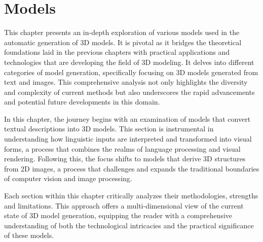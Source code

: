 \chapter{Models}\label{ch:models}

This chapter presents an in-depth exploration of various models used in the automatic generation of 3D models. It is pivotal as it bridges the theoretical foundations laid in the previous chapters with practical applications and technologies that are developing the field of 3D modeling. It delves into different categories of model generation, specifically focusing on 3D models generated from text and images. This comprehensive analysis not only highlights the diversity and complexity of current methods but also underscores the rapid advancements and potential future developments in this domain.

In this chapter, the journey begins with an examination of models that convert textual descriptions into 3D models. This section is instrumental in understanding how linguistic inputs are interpreted and transformed into visual forms, a process that combines the realms of language processing and visual rendering. Following this, the focus shifts to models that derive 3D structures from 2D images, a process that challenges and expands the traditional boundaries of computer vision and image processing.

Each section within this chapter critically analyzes their methodologies, strengths and limitations. This approach offers a multi-dimensional view of the current state of 3D model generation, equipping the reader with a comprehensive understanding of both the technological intricacies and the practical significance of these models.



